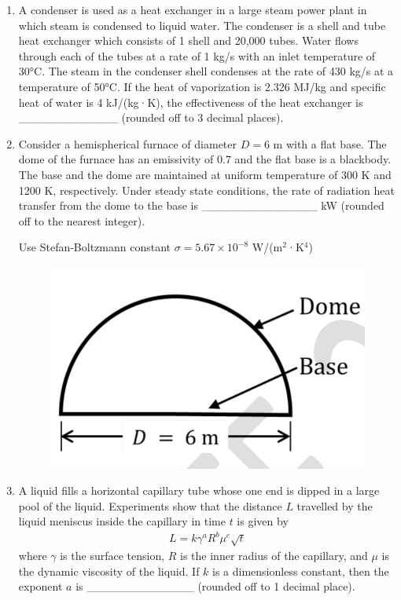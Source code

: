 \documentclass[journal,11pt,onecolumn]{IEEEtran}
\begin{document}
\begin{enumerate}[resume]
    \item A condenser is used as a heat exchanger in a large steam power plant in which steam is condensed to liquid water. The condenser is a shell and tube heat exchanger which consists of 1 shell and 20,000 tubes. Water flows through each of the tubes at a rate of 1 kg/s with an inlet temperature of 30°C. The steam in the condenser shell condenses at the rate of 430 kg/s at a temperature of 50°C. If the heat of vaporization is 2.326 MJ/kg and specific heat of water is 4 kJ/(kg·K), the effectiveness of the heat exchanger is \_\_\_\_\_\_\_\_\_\_\_\_ (rounded off to 3 decimal places).

    \item Consider a hemispherical furnace of diameter $D = 6$ m with a flat base. The dome of the furnace has an emissivity of 0.7 and the flat base is a blackbody. The base and the dome are maintained at uniform temperature of 300 K and 1200 K, respectively. Under steady state conditions, the rate of radiation heat transfer from the dome to the base is \_\_\_\_\_\_\_\_\_\_\_\_\_\_ kW (rounded off to the nearest integer).

          Use Stefan-Boltzmann constant $\sigma = 5.67 \times 10^{-8}$ W/(m$^2$·K$^4$)
          \begin{figure}[H]
              \centering
              \includegraphics[scale=0.2]{q50}
              \caption{}
              \label{fig:q50}
          \end{figure}

    \item A liquid fills a horizontal capillary tube whose one end is dipped in a large pool of the liquid. Experiments show that the distance $L$ travelled by the liquid meniscus inside the capillary in time $t$ is given by
          \begin{align}
              L = k \gamma^a R^b \mu^c \sqrt{t}
          \end{align}
          where $\gamma$ is the surface tension, $R$ is the inner radius of the capillary, and $\mu$ is the dynamic viscosity of the liquid. If $k$ is a dimensionless constant, then the exponent $a$ is \_\_\_\_\_\_\_\_\_\_\_\_\_ (rounded off to 1 decimal place).


\end{enumerate}
\end{document}
